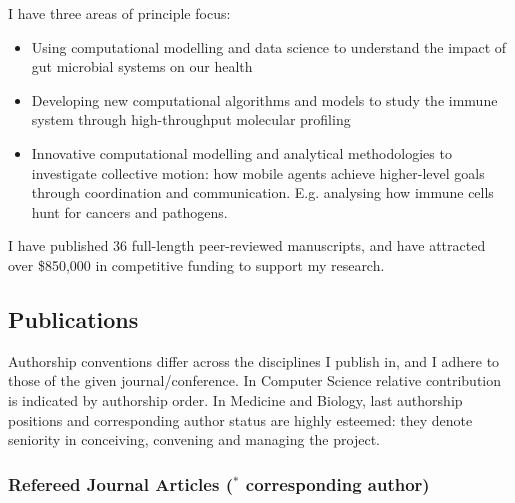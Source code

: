 \documentclass[a4paper]{article}
\begin{document}
I have three areas of principle focus:
\begin{itemize}
\item Using computational modelling and data science to understand the impact of gut microbial systems on our health
\item Developing new computational algorithms and models to study the immune system through high-throughput molecular profiling
\item Innovative computational modelling and analytical methodologies to investigate collective motion: how mobile agents achieve higher-level goals through coordination and communication. E.g. analysing how immune cells hunt for cancers and pathogens.
\end{itemize}

I have published 36 full-length peer-reviewed manuscripts, and have attracted over \$850,000 in competitive funding to support my research.

\subsection*{Publications}

Authorship conventions differ across the disciplines I publish in, and I adhere to those of the given journal/conference.
In Computer Science relative contribution is indicated by authorship order.
In Medicine and Biology, last authorship positions and corresponding author status are highly esteemed: they denote seniority in conceiving, convening and managing the project.

\subsubsection*{Refereed Journal Articles ($^{*}$ corresponding author)}
\end{document}
